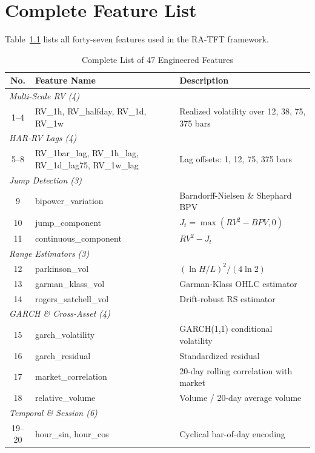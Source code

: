 \chapter{Complete Feature List}
\label{AppendixA}

Table~\ref{tab:features} lists all forty-seven features used in the RA-TFT framework.

\vspace*{\fill}
\begin{table}[h!]
\caption{Complete List of 47 Engineered Features}
\label{tab:features}
\centering
\small
\begin{tabular}{c l p{9cm}}
\hline
\textbf{No.} & \textbf{Feature Name} & \textbf{Description} \\
\hline
\multicolumn{3}{l}{\emph{Multi-Scale RV (4)}} \\
1--4 & RV\_1h, RV\_halfday, RV\_1d, RV\_1w & Realized volatility over 12, 38, 75, 375 bars \\
\hline
\multicolumn{3}{l}{\emph{HAR-RV Lags (4)}} \\
5--8 & RV\_1bar\_lag, RV\_1h\_lag, RV\_1d\_lag75, RV\_1w\_lag & Lag offsets: 1, 12, 75, 375 bars \\
\hline
\multicolumn{3}{l}{\emph{Jump Detection (3)}} \\
9 & bipower\_variation & Barndorff-Nielsen \& Shephard BPV \\
10 & jump\_component & $J_t=\max(RV^2-BPV,0)$ \\
11 & continuous\_component & $RV^2-J_t$ \\
\hline
\multicolumn{3}{l}{\emph{Range Estimators (3)}} \\
12 & parkinson\_vol & $(\ln H/L)^2/(4\ln2)$ \\
13 & garman\_klass\_vol & Garman-Klass OHLC estimator \\
14 & rogers\_satchell\_vol & Drift-robust RS estimator \\
\hline
\multicolumn{3}{l}{\emph{GARCH \& Cross-Asset (4)}} \\
15 & garch\_volatility & GARCH(1,1) conditional volatility \\
16 & garch\_residual & Standardized residual \\
17 & market\_correlation & 20-day rolling correlation with market \\
18 & relative\_volume & Volume / 20-day average volume \\
\hline
\multicolumn{3}{l}{\emph{Temporal \& Session (6)}} \\
19--20 & hour\_sin, hour\_cos & Cyclical bar-of-day encoding \\

\end{tabular}
\end{table}
